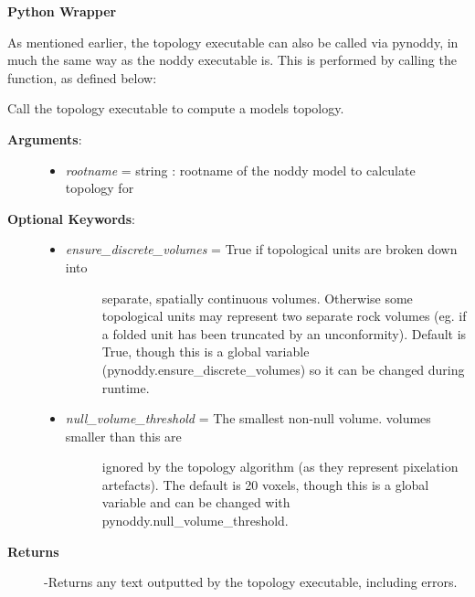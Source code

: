 \documentclass[a4paper,10pt,english]{sphinxmanual}
\begin{document}
\textbf{Python Wrapper}

As mentioned earlier, the topology executable can also be called via pynoddy, in much the same
way as the noddy executable is. This is performed by calling the 
function, as defined below:

\begin{fulllineitems}
\label{topology:pynoddy.compute_topology}
Call the topology executable to compute a models topology.
\begin{description}
\item[{\textbf{Arguments}:}] \leavevmode\begin{itemize}
\item {} 
\emph{rootname} = string : rootname of the noddy model to calculate topology for

\end{itemize}

\item[{\textbf{Optional Keywords}:}] \leavevmode\begin{itemize}
\item {} \begin{description}
\item[{\emph{ensure\_discrete\_volumes} = True if topological units are broken down into}] \leavevmode
separate, spatially continuous volumes. Otherwise
some topological units may represent two separate
rock volumes (eg. if a folded unit has been truncated
by an unconformity). Default is True, though this is
a global variable (pynoddy.ensure\_discrete\_volumes)
so it can be changed during runtime.

\end{description}

\item {} \begin{description}
\item[{\emph{null\_volume\_threshold} = The smallest non-null volume. volumes smaller than this are}] \leavevmode
ignored by the topology algorithm (as they represent pixelation artefacts).
The default is 20 voxels, though this is a global variable and can be changed
with pynoddy.null\_volume\_threshold.

\end{description}

\end{itemize}

\item[{\textbf{Returns}}] \leavevmode
-Returns any text outputted by the topology executable, including errors.

\end{description}

\end{fulllineitems}
\end{document}
